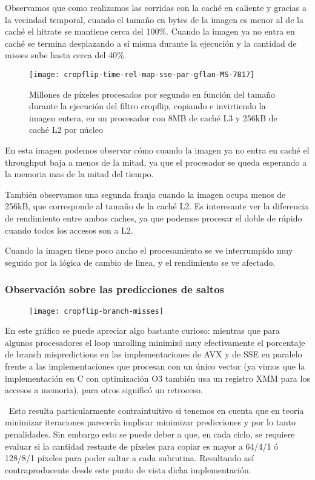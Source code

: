 Observamos que como realizamos las corridas con la caché en caliente y gracias a la vecindad temporal, cuando el tamaño en bytes de la imagen es menor al de la caché el hitrate se mantiene cerca del 100\%. Cuando la imagen ya no entra en caché se termina desplazando a sí misma durante la ejecución y la cantidad de misses sube hasta cerca del 40\%.

\begin{figure}[H]
\centering
\texttt{[image: cropflip-time-rel-map-sse-par-gflan-MS-7817]}
\caption{Millones de píxeles procesados por segundo en función del tamaño durante la ejecución del filtro cropflip, copiando e invirtiendo la imagen entera, en un procesador con 8MB de caché L3 y 256kB de caché L2 por núcleo}
\label{fig:cropflip-tame-rel-map-sse_par-gflan-MS-7817}
\end{figure}

En esta imagen podemos observar cómo cuando la imagen ya no entra en caché el throughput baja a menos de la mitad, ya que el procesador se queda esperando a la memoria mas de la mitad del tiempo.

También observamos una segunda franja cuando la imagen ocupa menos de 256kB, que corresponde al tamaño de la caché L2. Es interesante ver la diferencia de rendimiento entre ambas caches, ya que podemos procesar el doble de rápido cuando todos los accesos son a L2.

Cuando la imagen tiene poco ancho el procesamiento se ve interrumpido muy seguido por la lógica de cambio de linea, y el rendimiento se ve afectado.

\subsubsection{Observación sobre las predicciones de saltos}

\begin{figure}[H]
\centering
\texttt{[image: cropflip-branch-misses]}
\label{fig:cropflip-branch-misses}
\end{figure}

En este gráfico se puede apreciar algo bastante curioso: mientras que para algunos procesadores el loop unrolling minimizó muy efectivamente el porcentaje de branch mispredictions en las implementaciones de AVX y de SSE en paralelo frente a las implementaciones que procesan con un único vector (ya vimos que la implementación en C con optimización O3 también usa un registro XMM para los accesos a memoria), para otros significó un retroceso.

\ Esto resulta particularmente contraintuitivo si tenemos en cuenta que en teoría minimizar iteraciones parecería implicar minimizar predicciones y por lo tanto penalidades. Sin embargo esto se puede deber a que, en cada ciclo, se requiere evaluar si la cantidad restante de píxeles para copiar es mayor a  64/4/1 ó 128/8/1 píxeles para poder saltar a cada subrutina. Resultando así contraproducente desde este punto de vista dicha implementación.

